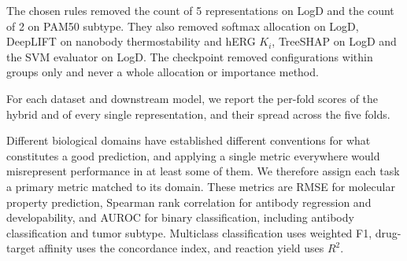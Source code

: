 The chosen rules removed the count of 5 representations on LogD and the count of 2 on PAM50 subtype. They also removed softmax allocation on LogD, DeepLIFT on nanobody thermostability and hERG $K_i$, TreeSHAP on LogD and the SVM evaluator on LogD. The checkpoint removed configurations within groups only and never a whole allocation or importance method.

For each dataset and downstream model, we report the per-fold scores of the hybrid and of every single representation, and their spread across the five folds.

Different biological domains have established different conventions for what constitutes a good prediction, and applying a single metric everywhere would misrepresent performance in at least some of them. We therefore assign each task a primary metric matched to its domain. These metrics are RMSE for molecular property prediction, Spearman rank correlation for antibody regression and developability, and AUROC for binary classification, including antibody classification and tumor subtype. Multiclass classification uses weighted F1, drug-target affinity uses the concordance index, and reaction yield uses $R^2$.

